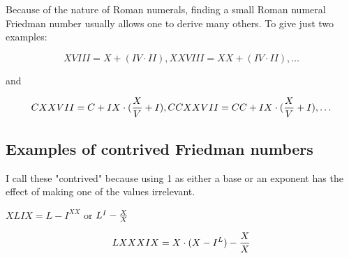 \documentclass[12pt]{article}
\begin{document}
Because of the nature of Roman numerals, finding a small Roman numeral Friedman number usually allows one to derive many others. To give just two examples: 

$$XVIII = X + (IV \cdot II), XXVIII = XX + (IV \cdot II), \ldots$$

and

$$CXXVII = C + IX \cdot ({X \over V} + I), CCXXVII = CC + IX \cdot ({X \over V} + I), \ldots$$

\subsection{Examples of contrived Friedman numbers}

I call these "contrived" because using 1 as either a base or an exponent has the effect of making one of the values irrelevant.

$XLIX = L - I^{XX}$ or $L^I - {X \over X}$

$$LXXXIX = X \cdot (X - I^L) - {X \over X}$$
\end{document}
